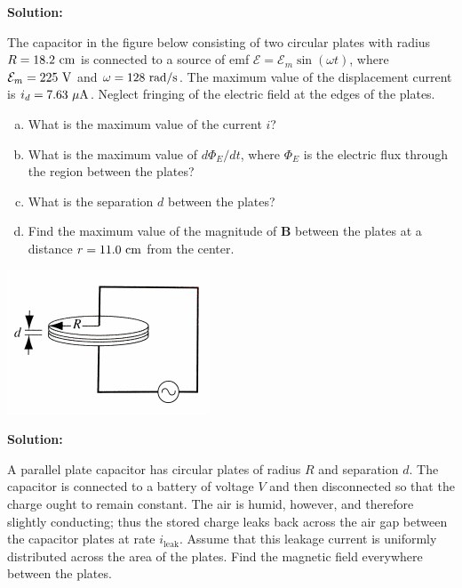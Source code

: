 \documentclass[11pt]{article}
\newcommand{\be}{\begin{enumerate}[a) ]}
\newcommand{\ee}{\end{enumerate}}
\begin{document}
\textbf{Solution:}\\

\clearpage

\begin{problem}[\P(P38.3)]
The capacitor in the figure below consisting of two circular plates with radius $R = 18.2~\mathrm{cm}$ is connected
to a source of emf  $\mathcal{E} = \mathcal{E}_m \sin(\omega t)$, where $\mathcal{E}_m = 225~\mathrm{V}$ and $\omega = 128~\mathrm{rad/s}$. The maximum value of
the displacement current is $i_d = 7.63~\mathrm{\mu A}$. Neglect fringing of the electric field at the edges of the
plates.
\be
\item What is the maximum value of the current $i$?
\item What is the maximum value of $d\Phi_E/dt$, where $\Phi_E$ is the electric flux through the region
between the plates?
\item What is the separation $d$ between the plates?
\item Find the maximum value of the magnitude of \textbf{B} between the plates at a distance $r = 11.0~\mathrm{cm}$
from the center.
\ee
\begin{center}
\includegraphics[scale=0.6]{prob5.png}
\end{center}
\end{problem}


\textbf{Solution:}\\

\clearpage

\begin{problem}
A parallel plate capacitor has circular plates of radius $R$ and separation $d$. The capacitor is
connected to a battery of voltage $V$ and then disconnected so that the charge ought to remain
constant. The air is humid, however, and therefore slightly conducting; thus the stored charge
leaks back across the air gap between the capacitor plates at rate $i_{\text{leak}}$. Assume that this leakage
current is uniformly distributed across the area of the plates. Find the magnetic field everywhere
between the plates.
\end{problem}
\end{document}
